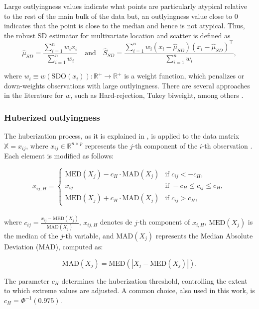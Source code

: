 \documentclass[12pt]{article}
\begin{document}
Large outlyingness values indicate what points are particularly atypical relative to the rest of the main bulk of the data but, an outlyingness value close to 0 indicates that the point is close to the median and hence is not atypical. Thus, the robust SD estimator for multivariate location and scatter is defined as
\begin{equation*}\label{EQ3}
    {\hat{\mu}}_{SD} = \frac{\sum_{i=1}^{n}w_ix_i}{\sum_{i=1}^{n}w_i}\quad\text{and}\quad{\hat{S}}_{SD} = \frac{\sum_{i=1}^{n}w_i(x_i-{\hat{\mu}}_{SD})(x_i-{\hat{\mu}}_{SD})^\top}{\sum_{i=1}^{n}w_i},
\end{equation*}
	
where $w_i\equiv w(\text{SDO}(x_i)):\mathbb{R}^+\rightarrow\mathbb{R}^+$ is a weight function, which penalizes or down-weights observations with large outlyingness. There are several approaches in the literature for $w$, such as Hard-rejection, Tukey biweight, among others \citep{Maronna2006}.


\subsubsection{Huberized outlyingness}


The huberization process, as it is explained in \citep{S.VanAelstandE.VandervierenandG.Willems2011}, is applied to the data matrix $\mathbb{X}  =  x_{ij}$, where $x_{ij} \in\mathbb{R}^{n\times p} $ represents the $j$-th component of the $i$-th observation . Each element is modified as follows:

$$
x_{ij,H} =
\begin{cases}
\text{MED}(X_j) - c_H \cdot \text{MAD}(X_j) & \text{if } c_{ij} < -c_H, \\
x_{ij} & \text{if } -c_H \leq c_{ij} \leq c_H, \\
\text{MED}(X_j) + c_H \cdot \text{MAD}(X_j) & \text{if } c_{ij} > c_H,
\end{cases}
$$
\\
where $c_{ij} = \frac{x_{ij} - \text{MED}(X_j)}{\text{MAD}(X_j)}$, $x_{ij,H}$ denotes de $j$-th component of $x_{i,H}$,  $\text{MED}(X_j)$ is the median of the $j$-th variable, and $\text{MAD}(X_j)$ represents the Median Absolute Deviation (MAD), computed as:

$$
\text{MAD}(X_j) = \text{MED}(|X_j - \text{MED}(X_j)|).
$$

The parameter $c_H$ determines the huberization threshold, controlling the extent to which extreme values are adjusted. A common choice, also used in this work, is $c_H = \Phi^{-1}(0.975)$.
\end{document}
